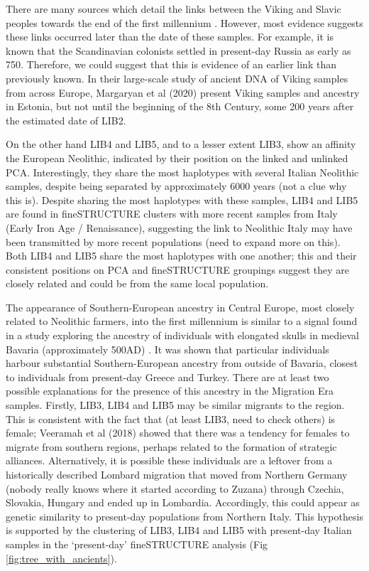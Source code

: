 There are many sources which detail the links between the Viking and Slavic peoples towards the end of the first millennium \cite{duczko2004viking, peterson2016vikings}. However, most evidence suggests these links occurred later than the date of these samples. For example, it is known that the Scandinavian colonists settled in present-day Russia as early as 750. Therefore, we could suggest that this is evidence of an earlier link than previously known. In their large-scale study of ancient DNA of Viking samples from across Europe, Margaryan et al (2020) present Viking samples and ancestry in Estonia, but not until the beginning of the 8th Century, some 200 years after the estimated date of LIB2.  

On the other hand LIB4 and LIB5, and to a lesser extent LIB3, show an affinity the European Neolithic, indicated by their position on the linked and unlinked PCA. Interestingly, they share the most haplotypes with several Italian Neolithic samples, despite being separated by approximately 6000 years (not a clue why this is). Despite sharing the most haplotypes with these samples, LIB4 and LIB5 are found in fineSTRUCTURE clusters with more recent samples from Italy (Early Iron Age / Renaissance), suggesting the link to Neolithic Italy may have been transmitted by more recent populations (need to expand more on this). Both LIB4 and LIB5 share the most haplotypes with one another; this and their consistent positions on PCA and fineSTRUCTURE groupings suggest they are closely related and could be from the same local population. 

The appearance of Southern-European ancestry in Central Europe, most closely related to Neolithic farmers, into the first millennium is similar to a signal found in a study exploring the ancestry of individuals with elongated skulls in medieval Bavaria (approximately 500AD) \cite{Veeramah2018}. It was shown that particular individuals harbour substantial Southern-European ancestry from outside of Bavaria, closest to individuals from present-day Greece and Turkey. There are at least two possible explanations for the presence of this ancestry in the Migration Era samples. Firstly, LIB3, LIB4 and LIB5 may be similar migrants to the region. This is consistent with the fact that (at least LIB3, need to check others) is female; Veeramah et al (2018) showed that there was a tendency for females to migrate from southern regions, perhaps related to the formation of strategic alliances. Alternatively, it is possible these individuals are a leftover from a historically described Lombard migration that moved from Northern Germany (nobody really knows where it started according to Zuzana) through Czechia, Slovakia, Hungary and ended up in Lombardia. Accordingly, this could appear as genetic similarity to present-day populations from Northern Italy. This hypothesis is supported by the clustering of LIB3, LIB4 and LIB5 with present-day Italian samples in the `present-day' fineSTRUCTURE analysis (Fig \ref{fig:tree_with_ancients}).

